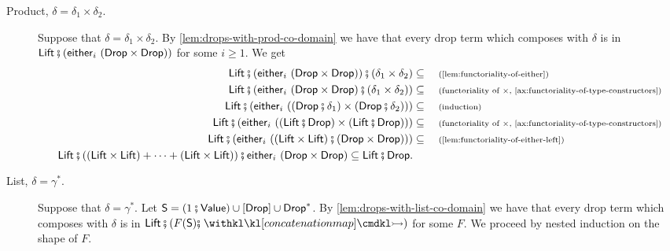 \begin{description}
\item[Product, $\delta = \delta_1 \times \delta_2$.] Suppose that $\delta = \delta_1 \times \delta_2$. By \cref{lem:drops-with-prod-co-domain} we have that every drop term which composes with $\delta$ is in $\Lift \comp (\eithermany{i}{\left( \Drop \times \Drop \right)})$ for some $i \geq 1$. We get 
\begin{align*}
	\Lift \comp \left(\eithermany{i}{\left( \Drop \times \Drop \right)} \right) \comp (\delta_1 \times \delta_2) &\subseteq \why{\cref{lem:functoriality-of-either}} \\ 
	\Lift \comp \left( \eithermany{i}{\left( \Drop \times \Drop \right) \comp (\delta_1 \times \delta_2)} \right) &\subseteq \why{functoriality of $\times$, \cref{ax:functoriality-of-type-constructors}} \\ 
	\Lift \comp \left( \eithermany{i}{\left( \left( \Drop \comp \delta_1 \right) \times \left( \Drop \comp \delta_2 \right) \right)} \right) &\subseteq \why{induction} \\
	\Lift \comp \left( \eithermany{i}{\left( \left( \Lift \comp \Drop \right) \times \left( \Lift \comp \Drop \right) \right)} \right) &\subseteq \why{functoriality of $\times$, \cref{ax:functoriality-of-type-constructors}} \\ 
	\Lift \comp \left( \eithermany{i}{\left( \left( \Lift \times \Lift \right) \comp \left( \Drop \times \Drop \right) \right)} \right) &\subseteq \why{\cref{lem:functoriality-of-either-left}} \\ 
	\Lift \comp \left( (\Lift \times \Lift) + \dots + (\Lift \times \Lift) \right) \comp \eithermany{i}{\left( \Drop \times \Drop \right)} \subseteq \Lift \comp \Drop.
\end{align*}

\item[List, $\delta = \gamma^*$.] Suppose that $\delta = \gamma^*$. Let $\mathsf{S} = (1 \comp \Value) \cup [\Drop] \cup \Drop^*$. By \cref{lem:drops-with-list-co-domain} we have that every drop term which composes with $\delta$ is in $\Lift \comp \left( F(\mathsf{S}) \comp \concmap \right)$ for some  $F$. We proceed by nested induction on the shape of $F$.


\end{description}

